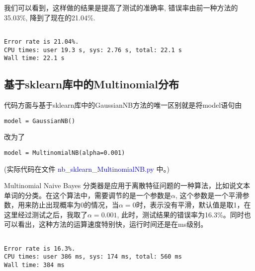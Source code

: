 \documentclass[a4paper, 1pt]{article}
\begin{document}
\begin{spacing}{1.2}
我们可以看到，这样做的结果是提高了测试的准确率, 错误率由前一种方法的35.03\%, 降到了现在的21.04\%.
\begin{lstlisting}

Error rate is 21.04%.
CPU times: user 19.3 s, sys: 2.76 s, total: 22.1 s
Wall time: 22.1 s
\end{lstlisting}

\subsection{基于sklearn库中的Multinomial分布}
代码方面与基于sklearn库中的GaussianNB方法的唯一区别就是将model语句由
\begin{lstlisting}
model = GaussianNB()
\end{lstlisting}
改为了
\begin{lstlisting}
model = MultinomialNB(alpha=0.001)
\end{lstlisting}
(实际代码在文件 \textcolor{blue}{ nb\_sklearn\_MultinomialNB.py} 中。)

Multinomial Naive Bayes 分类器是应用于离散特征问题的一种算法，比如说文本单词的分类。在这个算法中，需要调节的是一个参数是$\alpha$, 这个参数是一个平滑参数，用来防止出现概率为0的情况，当$\alpha=0$时，表示没有平滑，默认值是取1，在这里经过测试之后，我取了$\alpha=0.001$, 此时，测试结果的错误率为16.3\%。同时也可以看出，这种方法的运算速度特别快，运行时间还是在ms级别。
\begin{lstlisting}

Error rate is 16.3%.
CPU times: user 386 ms, sys: 174 ms, total: 560 ms
Wall time: 384 ms
\end{lstlisting}



\end{spacing}
\end{document}
